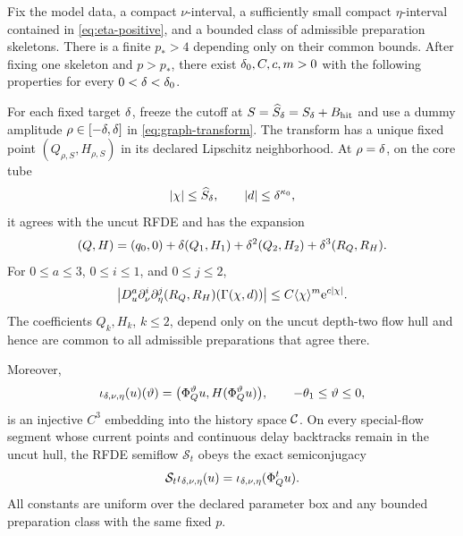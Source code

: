 \begin{theorem}
\label{thm:history-graph}
Fix the model data, a compact \(\nu\)-interval, a sufficiently small compact
\(\eta\)-interval contained in \cref{eq:eta-positive}, and a bounded
class of admissible preparation skeletons.  There is a finite \(p_*>4\)
depending only on their common bounds.  After fixing one skeleton and
\(p>p_*\), there exist \(\delta_0,C,c,m>0\) with the following
properties for every \(0<\delta<\delta_0\).

For each fixed target \(\delta\), freeze the cutoff at
\(S=\widehat S_\delta=S_\delta+B_{\rm hit}\) and use a dummy amplitude
\(\rho\in[-\delta,\delta]\) in
\cref{eq:graph-transform}.  The transform has a unique fixed point
\((Q_{\rho,S},H_{\rho,S})\) in its declared Lipschitz neighborhood.  At
\(\rho=\delta\), on the core tube
\begin{equation}
\label{eq:core-tube}
 |\chi|\le \widehat S_\delta,\qquad |d|\le\delta^{\kappa_0},
\end{equation}
it agrees with the uncut RFDE and has the expansion
\begin{equation}
\label{eq:growing-graph-expansion}
 (Q,H)=(q_0,0)+\delta(Q_1,H_1)+\delta^2(Q_2,H_2)
       +\delta^3(R_Q,R_H).
\end{equation}
For \(0\le a\le3\), \(0\le i\le1\), and \(0\le j\le2\),
\begin{equation}
\label{eq:growing-graph-remainder}
 \bigl|D_u^a\partial_\nu^i\partial_\eta^j(R_Q,R_H)
       (\Gamma(\chi,d))\bigr|
 \le C\langle\chi\rangle^m\mathrm e^{c|\chi|}.
\end{equation}
The coefficients \(Q_k,H_k\), \(k\le2\), depend only on the uncut
depth-two flow hull and hence are common to all admissible preparations
that agree there.

Moreover,
\begin{equation}
\label{eq:history-embedding}
 \iota_{\delta,\nu,\eta}(u)(\vartheta)
 =\bigl(\Phi_Q^\vartheta u,
        H(\Phi_Q^\vartheta u)\bigr),
 \qquad -\theta_1\le\vartheta\le0,
\end{equation}
is an injective \(C^3\) embedding into the history space \(\mathcal C\).  On every
special-flow segment whose current points and continuous delay backtracks
remain in the uncut hull, the RFDE semiflow \(\mathcal S_t\) obeys the exact
semiconjugacy
\begin{equation}
\label{eq:exact-semiconjugacy}
 \mathcal S_t\iota_{\delta,\nu,\eta}(u)
 =\iota_{\delta,\nu,\eta}(\Phi_Q^tu).
\end{equation}
All constants are uniform over the declared parameter box and any bounded
preparation class with the same fixed \(p\).
\end{theorem}


